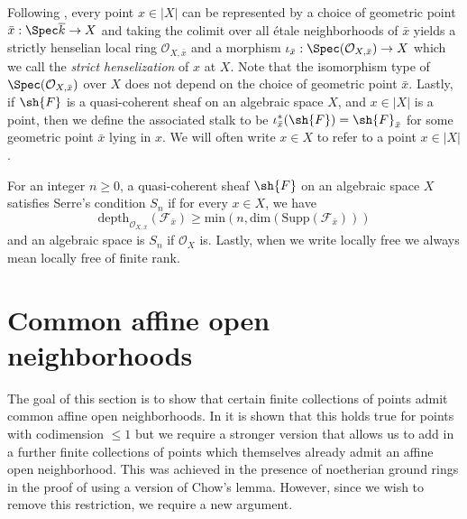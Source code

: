 \documentclass[12pt]{amsart}
\begin{document}
Following \cite[Tag 04KG]{stacks}, every point $x \in |X|$ can be represented by a choice of geometric point $\bar{x}: \Spec \overline{k} \to X$ and taking the colimit over all \'etale neighborhoods of $\bar{x}$ yields a strictly henselian local ring $\mathcal{O}_{X,\bar{x}}$ and a morphism $\iota_{\bar{x}}: \Spec (\mathcal{O}_{X,\bar{x}}) \to X$ which we call the \emph{strict henselization} of $x$ at $X$. Note that the isomorphism type of $\Spec (\mathcal{O}_{X,\bar{x}})$ over $X$ does not depend on the choice of geometric point $\bar{x}$. Lastly, if $\sh{F}$ is a quasi-coherent sheaf on an algebraic space $X$, and $x \in |X|$ is a point, then we define the associated stalk to be $\iota_{\bar{x}}^*(\sh{F})=\sh{F}_{\bar{x}}$ for some geometric point $\bar{x}$ lying in $x$. We will often write $x \in X$ to refer to a point $x \in |X|$.

 For an integer $n \geq 0$, a quasi-coherent sheaf $\sh{F}$ on an algebraic space $X$ satisfies Serre's condition $S_n$ if for every $x \in X$, we have 
 \[\text{depth}_{\mathcal{O}_{X,\bar{x}}}(\mathcal{F}_{\bar{x}}) \geq \text{min}(n,\text{dim}(\text{Supp}(\mathcal{F}_{\bar{x}})))\]
and an algebraic space is $S_n$ if $\mathcal{O}_X$ is. Lastly, when we write locally free we always mean locally free of finite rank.
 

\section{Common affine open neighborhoods} \label{sec:common}

The goal of this section is to show that certain finite collections of points admit common affine open neighborhoods. In \cite[Tag 0ANN]{stacks} it is shown that this holds true for points with codimension $\leq 1$ but we require a stronger version that allows us to add in a further finite collections of points which themselves already admit an affine open neighborhood. This was achieved in the presence of noetherian ground rings in the proof of \cite[Thm. 1.5]{SurfaceRes} using a version of Chow's lemma. However, since we wish to remove this restriction, we require a new argument.
\end{document}
